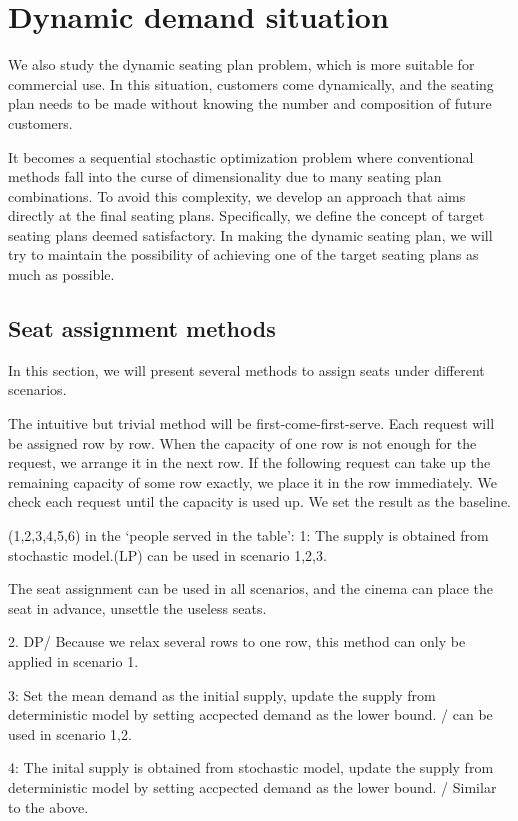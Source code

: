 \section{Dynamic demand situation}\label{dynamic_demand}

We also study the dynamic seating plan problem, which is more suitable for commercial use. In this situation, customers come dynamically, and the seating plan needs to be made without knowing the number and composition of future customers. 

It becomes a sequential stochastic optimization problem where conventional methods fall into the curse of dimensionality due to many seating plan combinations. To avoid this complexity, we develop an approach that aims directly at the final seating plans. Specifically, we define the concept of target seating plans deemed satisfactory. In making the dynamic seating plan, we will try to maintain the possibility of achieving one of the target seating plans as much as possible.

\subsection{Seat assignment methods}
In this section, we will present several methods to assign seats under different scenarios.

The intuitive but trivial method will be first-come-first-serve. Each request will be assigned row by row. When the capacity of one row is not enough for the request, we arrange it in the next row. If the following request can take up the remaining capacity of some row exactly, we place it in the row immediately. We check each request until the capacity is used up. We set the result as the baseline.

(1,2,3,4,5,6) in the `people served in the table': 
1: The supply is obtained from stochastic model.(LP)  can be used in scenario 1,2,3.

The seat assignment can be used in all scenarios, and the cinema can place the seat in advance, unsettle the useless seats.

2. DP/ Because we relax several rows to one row, this method can only be applied in scenario 1.

3: Set the mean demand as the initial supply, update the supply from deterministic model by setting accpected demand as the lower bound. / can be used in scenario 1,2.

4: The inital supply is obtained from stochastic model, update the supply from deterministic model by setting accpected demand as the lower bound. / Similar to the above.

